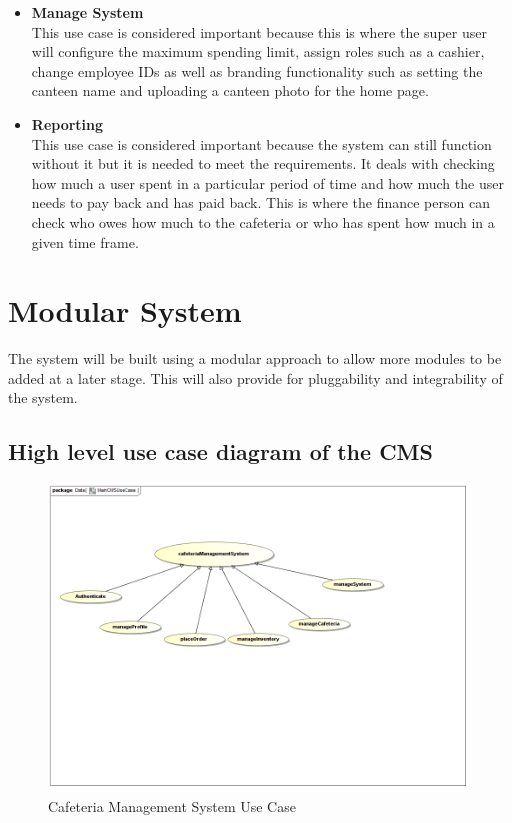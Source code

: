 \documentclass[a4paper,12pt]{report}
\begin{document}
\begin{itemize}
\item \textbf{ Manage System} \\
This use case is considered important because this is where the super user will configure the maximum spending limit, assign roles such as a cashier, change employee IDs as well as branding functionality such as setting the canteen name and uploading a canteen photo for the home page.


\item \textbf{Reporting} \\
This use case is considered important because the system can still function without it but it is needed to meet the requirements. It deals with checking how much a user spent in a particular period of time and how much the user needs to pay back and has paid back. This is where the finance person can check who owes how much to the cafeteria or who has spent how much in a given time frame. 

\end{itemize}

\section{Modular System}

The system will be built using a modular approach to allow more modules to be added at a later stage. This will also provide for pluggability and integrability of the system.

\subsection{High level use case diagram of the CMS}
\begin{figure}[H]
  \centering
    \includegraphics[width=1.0\textwidth]{../images/CMSUseCase.png}
    \caption{Cafeteria Management System Use Case} 
\end{figure}
\end{document}
